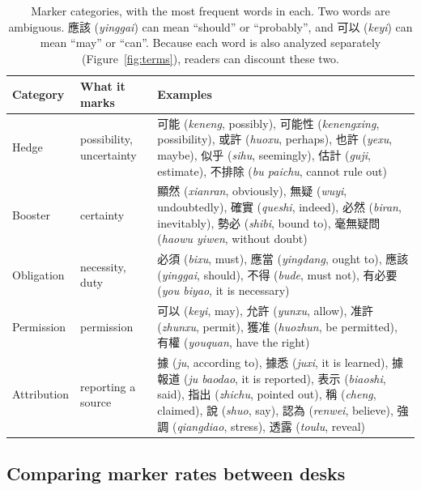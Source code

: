 \documentclass[11pt]{article}
\begin{document}
\begin{table}[tbp]
\centering
\small
\begin{tabular}{@{}llp{}@{}}
\toprule
Category & What it marks & Examples \\
\midrule
Hedge & possibility, uncertainty & 可能 (\textit{keneng}, possibly), 可能性 (\textit{kenengxing}, possibility), 或許 (\textit{huoxu}, perhaps), 也許 (\textit{yexu}, maybe), 似乎 (\textit{sihu}, seemingly), 估計 (\textit{guji}, estimate), 不排除 (\textit{bu paichu}, cannot rule out) \\
\addlinespace
Booster & certainty & 顯然 (\textit{xianran}, obviously), 無疑 (\textit{wuyi}, undoubtedly), 確實 (\textit{queshi}, indeed), 必然 (\textit{biran}, inevitably), 勢必 (\textit{shibi}, bound to), 毫無疑問 (\textit{haowu yiwen}, without doubt) \\
\addlinespace
Obligation & necessity, duty & 必須 (\textit{bixu}, must), 應當 (\textit{yingdang}, ought to), 應該 (\textit{yinggai}, should), 不得 (\textit{bude}, must not), 有必要 (\textit{you biyao}, it is necessary) \\
\addlinespace
Permission & permission & 可以 (\textit{keyi}, may), 允許 (\textit{yunxu}, allow), 准許 (\textit{zhunxu}, permit), 獲准 (\textit{huozhun}, be permitted), 有權 (\textit{youquan}, have the right) \\
\addlinespace
Attribution & reporting a source & 據 (\textit{ju}, according to), 據悉 (\textit{juxi}, it is learned), 據報道 (\textit{ju baodao}, it is reported), 表示 (\textit{biaoshi}, said), 指出 (\textit{zhichu}, pointed out), 稱 (\textit{cheng}, claimed), 說 (\textit{shuo}, say), 認為 (\textit{renwei}, believe), 強調 (\textit{qiangdiao}, stress), 透露 (\textit{toulu}, reveal) \\
\bottomrule
\end{tabular}
\caption{Marker categories, with the most frequent words in each. Two words are ambiguous. 應該 (\textit{yinggai}) can mean ``should'' or ``probably'', and 可以 (\textit{keyi}) can mean ``may'' or ``can''. Because each word is also analyzed separately (Figure~\ref{fig:terms}), readers can discount these two.}
\label{tab:lexicon}
\end{table}

\subsection{Comparing marker rates between desks}
\end{document}
